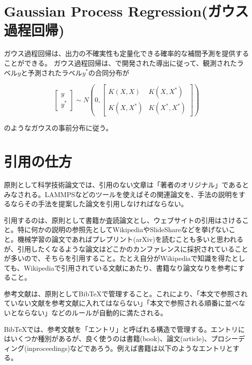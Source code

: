\documentclass[titlepage]{jsreport}
\begin{document}
{{{\section{Gaussian Process Regression(ガウス過程回帰)}\label{method-sec:Gauss}

ガウス過程回帰は、出力の不確実性も定量化できる確率的な補間予測を提供する\cite{machine-learning}ことができる。
ガウス過程回帰は、\cite{Gaussian-Processes-for-Machine-Learning}で開発された導出に従って、観測されたラベル$y$と予測されたラベル$y^*$の合同分布が

\large
\[
    \left[
        \begin{array}{l}
            y \\
            y^* 
        \end{array}
    \right]
    {\sim} N
    \left(0,
        \left[
            \begin{array}{cc}
                K(X,X) & K(X,X^*)\\    
                K(X,X^*) & K(X^*,X^*)
            \end{array}
        \right]
    \right)
\]
\normalsize

のようなガウスの事前分布に従う。


\section{引用の仕方}

原則として科学技術論文では、引用のない文章は「著者のオリジナル」であるとみなされる。LAMMPSなどのツールを使えばその関連論文を、手法の説明をするならその手法を提案した論文を引用しなければならない。

引用するのは、原則として書籍か査読論文とし、ウェブサイトの引用はさけること。特に何かの説明の参照先としてWikipediaやSlideShareなどを挙げないこと。機械学習の論文であればプレプリント(arXiv)を読むことも多いと思われるが、引用したくなるような論文はどこかのカンファレンスに採択されていることが多いので、そちらを引用すること。たとえ自分がWikipediaで知識を得たとしても、Wikipediaで引用されている文献にあたり、書籍なり論文なりを参考にすること。

参考文献は、原則としてBibTeXで管理すること。これにより、「本文で参照されていない文献を参考文献に入れてはならない」「本文で参照される順番に並べないとならない」などのルールが自動的に満たされる。

BibTeXでは、参考文献を「エントリ」と呼ばれる構造で管理する。エントリにはいくつか種別があるが、良く使うのは書籍(book)、論文(article)、プロシーディング(inproceedings)などであろう。例えば書籍は以下のようなエントリとする。

}}}
\end{document}
